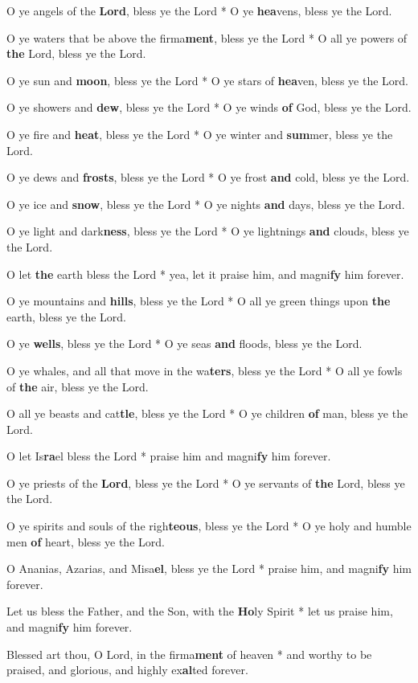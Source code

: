 \begin{multicols}{2}
	O ye angels of the \textbf{Lord}, bless ye the Lord * O ye \textbf{hea}vens, bless ye the Lord.
	
	O ye waters that be above the firma\textbf{ment}, bless ye the Lord * O all ye powers of \textbf{the} Lord, bless ye the Lord.
	
	O ye sun and \textbf{moon}, bless ye the Lord * O ye stars of \textbf{hea}ven, bless ye the Lord.
	
	O ye showers and \textbf{dew}, bless ye the Lord * O ye winds \textbf{of} God, bless ye the Lord.
	
	O ye fire and \textbf{heat}, bless ye the Lord * O ye winter and \textbf{sum}mer, bless ye the Lord.
	
	O ye dews and \textbf{frosts}, bless ye the Lord * O ye frost \textbf{and} cold, bless ye the Lord.
	
	O ye ice and \textbf{snow}, bless ye the Lord * O ye nights \textbf{and} days, bless ye the Lord.
	
	O ye light and dark\textbf{ness}, bless ye the Lord * O ye lightnings \textbf{and} clouds, bless ye the Lord.
	
	O let \textbf{the} earth bless the Lord * yea, let it praise him, and magni\textbf{fy} him forever.
	
	O ye mountains and \textbf{hills}, bless ye the Lord * O all ye green things upon \textbf{the} earth, bless ye the Lord.
	
	O ye \textbf{wells}, bless ye the Lord * O ye seas \textbf{and} floods, bless ye the Lord.
	
	O ye whales, and all that move in the wa\textbf{ters}, bless ye the Lord * O all ye fowls of \textbf{the} air, bless ye the Lord.
	
	O all ye beasts and cat\textbf{tle}, bless ye the Lord * O ye children \textbf{of} man, bless ye the Lord.
	
	O let Is\textbf{ra}el bless the Lord * praise him and magni\textbf{fy} him forever.
	
	O ye priests of the \textbf{Lord}, bless ye the Lord * O ye servants of \textbf{the} Lord, bless ye the Lord.
	
	O ye spirits and souls of the righ\textbf{teous}, bless ye the Lord * O ye holy and humble men \textbf{of} heart, bless ye the Lord.
	
	O Ananias, Azarias, and Misa\textbf{el}, bless ye the Lord * praise him, and magni\textbf{fy} him forever.
	
	Let us bless the Father, and the Son, with the \textbf{Ho}ly Spirit * let us praise him, and magni\textbf{fy} him forever.
	
	Blessed art thou, O Lord, in the firma\textbf{ment} of heaven * and worthy to be praised, and glorious, and highly ex\textbf{al}ted forever.
\end{multicols}